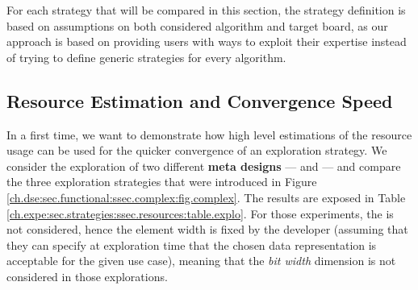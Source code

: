     For each strategy that will be compared in this section, the strategy definition is based on assumptions on both considered algorithm and target board, as our approach is based on providing users with ways to exploit their expertise instead of trying to define generic strategies for every algorithm.

    \subsection{Resource Estimation and Convergence Speed}
    \label{ch.expe:sec.strategies:ssec.resource}
    
        In a first time, we want to demonstrate how high level estimations of the resource usage can be used for the quicker convergence of an exploration strategy.
        We consider the exploration of two different {\bf meta designs} ---  and  --- and compare the three exploration strategies that were introduced in Figure \ref{ch.dse:sec.functional:ssec.complex:fig.complex}.
        The results are exposed in Table \ref{ch.expe:sec.strategies:ssec.resources:table.explo}.
        For those experiments, the  is not considered, hence the element width is fixed by the developer (assuming that they can specify at exploration time that the chosen data representation is acceptable for the given use case), meaning that the {\it bit width} dimension is not considered in those explorations.

